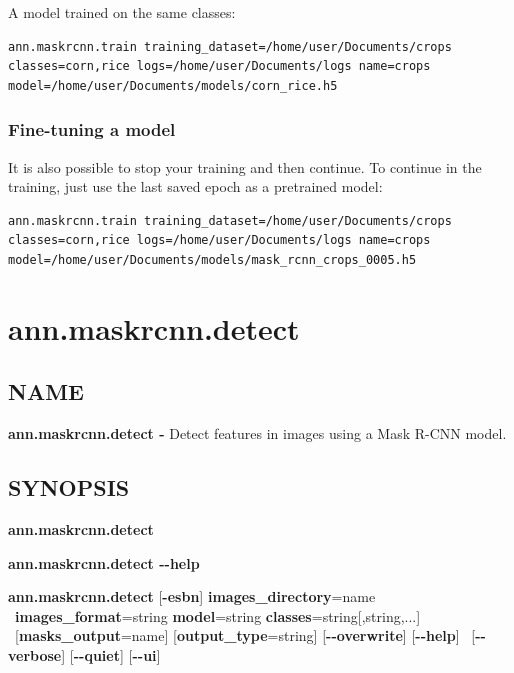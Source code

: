 A model trained on the same classes:

{\footnotesize
\begin{lstlisting}[breaklines=true]
ann.maskrcnn.train training_dataset=/home/user/Documents/crops classes=corn,rice logs=/home/user/Documents/logs name=crops model=/home/user/Documents/models/corn_rice.h5
\end{lstlisting}
}

\subsubsection*{Fine-tuning a model}
It is also possible to stop your training and then continue. To continue in the
training, just use the last saved epoch as a pretrained model:

{\footnotesize
\begin{lstlisting}[breaklines=true]
ann.maskrcnn.train training_dataset=/home/user/Documents/crops classes=corn,rice logs=/home/user/Documents/logs name=crops model=/home/user/Documents/models/mask_rcnn_crops_0005.h5
\end{lstlisting}
}

\clearpage

\section{ann.maskrcnn.detect}

\subsection*{NAME}

\textbf{ann.maskrcnn.detect -} Detect features in images using a Mask R-CNN model.

\subsection*{SYNOPSIS}

\begin{flushleft}
\textbf{ann.maskrcnn.detect} 

\textbf{ann.maskrcnn.detect -{}-help}

\textbf{ann.maskrcnn.detect} [\textbf{-esbn}] \textbf{images\_directory}=name \tab\ \textbf{images\_format}=string \textbf{model}=string \textbf{classes}=string[,string,...] \tab\ [\textbf{masks\_output}=name] [\textbf{output\_type}=string] [\textbf{-{}-overwrite}] [\textbf{-{}-help}] \tab\ [\textbf{-{}-verbose}] [\textbf{-{}-quiet}] [\textbf{-{}-ui}]
\end{flushleft}

